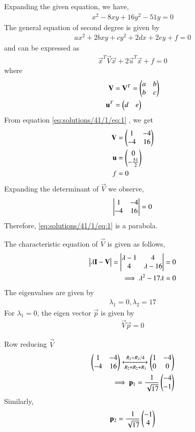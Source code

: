 Expanding the given equation, we have,
\begin{align}
    x^2 -8xy +16y^2 -51y =0 \label{eq:solutions/41/1/eq:1}
\end{align}
The general equation of second degree is given by
\begin{align}
	ax^2+2bxy+cy^2+2dx+2ey+f=0 \label{eq:solutions/41/1/gen_eq}
\end{align}
and can be expressed as
\begin{align}
	\vec{x}^T\vec{V}\vec{x}+2\vec{u}^T\vec{x}+f=0 \label{eq:solutions/41/1/conic_eq}
\end{align}
where
\begin{align}
	\mathbf{V} &= \mathbf{V}^T = \begin{pmatrix}a & b \\ b & c\end{pmatrix}
	\\
	\mathbf{u}^T &= \begin{pmatrix}d & e\end{pmatrix}
\end{align}
From equation \eqref{eq:solutions/41/1/eq:1} , we get
\begin{align}
	\mathbf{V} &= \begin{pmatrix}1 & -4\\-4 & 16\end{pmatrix}\label{eq:solutions/41/1/eq:2}\\
	\mathbf{u} &= \begin{pmatrix}0\\-\frac{51}{2}\end{pmatrix}\label{eq:solutions/41/1/eq:3}\\ 
	f &= 0 \label{eq:solutions/41/1/eq:4}
\end{align}
Expanding the determinant of $\vec{V}$ we observe, 
\begin{align}
	\begin{vmatrix}1 & -4\\-4 & 16\end{vmatrix} = 0
\end{align}
Therefore, \eqref{eq:solutions/41/1/eq:1} is a parabola.

The characteristic equation of $\vec{V}$ is given as follows,
\begin{align}
		\begin{vmatrix}\lambda\mathbf{I}-\mathbf{V}\end{vmatrix} = \begin{vmatrix}\lambda-1&4\\ 4&\lambda-16\end{vmatrix} &= 0\\
		\implies \lambda^2-17\lambda &= 0\label{eq:solutions/41/1/eq:5}
\end{align}
The eigenvalues are given by
\begin{align}
		\lambda_1=0, \lambda_2=17\label{eq:solutions/41/1/eq:6}    
\end{align}
For $\lambda_1 = 0$, the eigen vector $\vec{p}$ is given by 
\begin{align}
		\vec{V}\vec{p} = 0
\end{align}

Row reducing $\vec{V}$ 
\begin{align}
		\begin{pmatrix}1&-4\\-4&16\end{pmatrix}\xleftrightarrow[R_2=R_2+R_1]{R_2=R_2/4}\begin{pmatrix}1&-4\\0&0\end{pmatrix}\\
		\implies\mathbf{p}_1=\frac{1}{\sqrt{17}}\begin{pmatrix}-4\\-1\end{pmatrix} \label{eq:solutions/41/1/eq:7}
\end{align}
Similarly, 
\begin{align}
		\mathbf{p}_2=\frac{1}{\sqrt{17}}\begin{pmatrix}-1\\4\end{pmatrix} \label{eq:solutions/41/1/eq:8}
\end{align}

